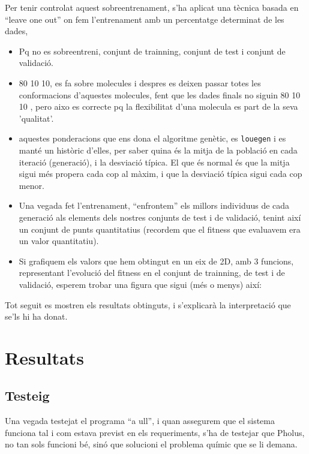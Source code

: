 \documentclass[titlepage,a4paper,12pt]{book}
\begin{document}
Per tenir controlat aquest sobreentrenament, s'ha aplicat una tècnica basada en
``leave one out'' on fem l'entrenament amb un percentatge determinat de les
dades, 

\begin{itemize}
	\item Pq no es sobreentreni, conjunt de trainning, conjunt de test i conjunt
		de validació.
	\item 80 10 10, es fa sobre molecules i despres es deixen passar totes les
		conformacions d'aquestes molecules, fent que les dades finals no siguin 80 10 10
		, pero aixo es correcte pq la flexibilitat d'una molecula es part de la seva
		'qualitat'.
	\item aquestes ponderacions que ens dona el algoritme genètic, es
		\texttt{louegen} i es manté un històric d'elles, per saber quina és la mitja
		de la població en cada iteració (generació), i la desviació típica.  El que
		és normal és que la mitja sigui més propera cada cop al màxim, i que la
		desviació típica sigui cada cop menor.
	\item Una vegada fet l'entrenament, ``enfrontem'' els millors individuus de
	cada generació als elements dels nostres conjunts de test i de validació,
	tenint així un conjunt de punts quantitatius (recordem que el fitness que
	evaluavem era un valor quantitatiu).
	\item Si grafiquem els valors que hem obtingut en un eix de 2D, amb 3
	funcions, representant l'evolució del fitness en el conjunt de trainning, de
	test i de validació, esperem trobar una figura que sigui (més o menys) així:
\end{itemize}
 
Tot seguit es mostren els resultats obtinguts, i s'explicarà la interpretació
que se'ls hi ha donat.



\section{Resultats} %
\label{sec:Resultats}

\subsection{Testeig} %
\label{sub:Testeig}

Una vegada testejat el programa ``a ull'', i quan assegurem que el sistema
funciona tal i com estava previst en els requeriments, s'ha de testejar que
Pholus, no tan sols funcioni bé, sinó que solucioni el problema químic que se li
demana.
\end{document}
